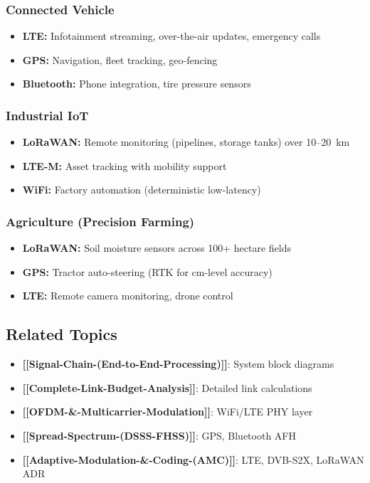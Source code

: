 \subsubsection*{Connected Vehicle}
\begin{itemize}
\item \textbf{LTE:} Infotainment streaming, over-the-air updates, emergency calls
\item \textbf{GPS:} Navigation, fleet tracking, geo-fencing
\item \textbf{Bluetooth:} Phone integration, tire pressure sensors
\end{itemize}

\subsubsection*{Industrial IoT}
\begin{itemize}
\item \textbf{LoRaWAN:} Remote monitoring (pipelines, storage tanks) over 10--20~km
\item \textbf{LTE-M:} Asset tracking with mobility support
\item \textbf{WiFi:} Factory automation (deterministic low-latency)
\end{itemize}

\subsubsection*{Agriculture (Precision Farming)}
\begin{itemize}
\item \textbf{LoRaWAN:} Soil moisture sensors across 100+ hectare fields
\item \textbf{GPS:} Tractor auto-steering (RTK for cm-level accuracy)
\item \textbf{LTE:} Remote camera monitoring, drone control
\end{itemize}

\subsection{Related Topics}\label{related-topics}

\begin{itemize}
\tightlist
\item
  \textbf{{[}{[}Signal-Chain-(End-to-End-Processing){]}{]}}: System
  block diagrams
\item
  \textbf{{[}{[}Complete-Link-Budget-Analysis{]}{]}}: Detailed link
  calculations
\item
  \textbf{{[}{[}OFDM-\&-Multicarrier-Modulation{]}{]}}: WiFi/LTE PHY
  layer
\item
  \textbf{{[}{[}Spread-Spectrum-(DSSS-FHSS){]}{]}}: GPS, Bluetooth AFH
\item
  \textbf{{[}{[}Adaptive-Modulation-\&-Coding-(AMC){]}{]}}: LTE,
  DVB-S2X, LoRaWAN ADR
\end{itemize}

